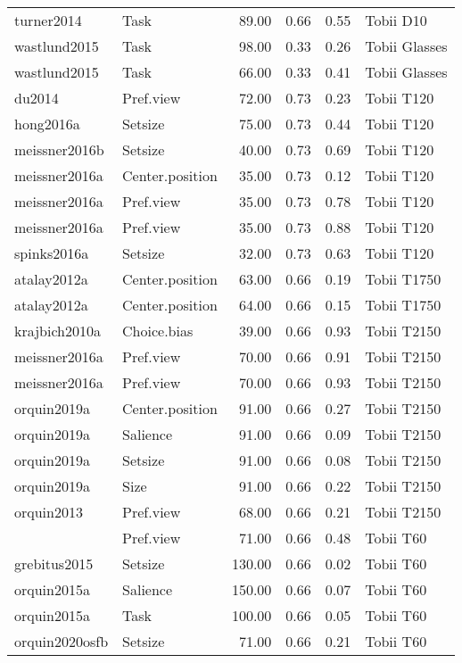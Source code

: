 \begin{table}[ht]
\begin{tabular}{llrrrl}
  turner2014 & Task & 89.00 & 0.66 & 0.55 & Tobii D10 \\ 
  wastlund2015 & Task & 98.00 & 0.33 & 0.26 & Tobii Glasses \\ 
  wastlund2015 & Task & 66.00 & 0.33 & 0.41 & Tobii Glasses \\ 
  du2014 & Pref.view & 72.00 & 0.73 & 0.23 & Tobii T120 \\ 
  hong2016a & Setsize & 75.00 & 0.73 & 0.44 & Tobii T120 \\ 
  meissner2016b & Setsize & 40.00 & 0.73 & 0.69 & Tobii T120 \\ 
  meissner2016a & Center.position & 35.00 & 0.73 & 0.12 & Tobii T120 \\ 
  meissner2016a & Pref.view & 35.00 & 0.73 & 0.78 & Tobii T120 \\ 
  meissner2016a & Pref.view & 35.00 & 0.73 & 0.88 & Tobii T120 \\ 
  spinks2016a & Setsize & 32.00 & 0.73 & 0.63 & Tobii T120 \\ 
  atalay2012a & Center.position & 63.00 & 0.66 & 0.19 & Tobii T1750 \\ 
  atalay2012a & Center.position & 64.00 & 0.66 & 0.15 & Tobii T1750 \\ 
  krajbich2010a & Choice.bias & 39.00 & 0.66 & 0.93 & Tobii T2150 \\ 
  meissner2016a & Pref.view & 70.00 & 0.66 & 0.91 & Tobii T2150 \\ 
  meissner2016a & Pref.view & 70.00 & 0.66 & 0.93 & Tobii T2150 \\ 
  orquin2019a & Center.position & 91.00 & 0.66 & 0.27 & Tobii T2150 \\ 
  orquin2019a & Salience & 91.00 & 0.66 & 0.09 & Tobii T2150 \\ 
  orquin2019a & Setsize & 91.00 & 0.66 & 0.08 & Tobii T2150 \\ 
  orquin2019a & Size & 91.00 & 0.66 & 0.22 & Tobii T2150 \\ 
  orquin2013 & Pref.view & 68.00 & 0.66 & 0.21 & Tobii T2150 \\ 
  \cite{ares2014} & Pref.view & 71.00 & 0.66 & 0.48 & Tobii T60 \\ 
  grebitus2015 & Setsize & 130.00 & 0.66 & 0.02 & Tobii T60 \\ 
  orquin2015a & Salience & 150.00 & 0.66 & 0.07 & Tobii T60 \\ 
  orquin2015a & Task & 100.00 & 0.66 & 0.05 & Tobii T60 \\ 
  orquin2020osfb & Setsize & 71.00 & 0.66 & 0.21 & Tobii T60 \\ 

\end{tabular}
\end{table}
